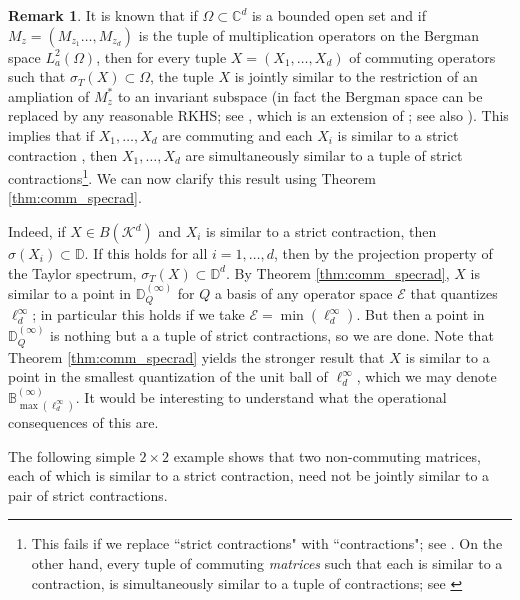 \documentclass[12pt]{amsart}
\numberwithin{equation}{section}
\theoremstyle{definition}
\newtheorem{remark}[theorem]{Remark}
\newcommand{\cE}{\mathcal{E}}
\newcommand{\cK}{\mathcal{K}}
\newcommand{\bB}{\mathbb{B}}
\newcommand{\bC}{\mathbb{C}}
\newcommand{\bD}{\mathbb{D}}
\begin{document}
\begin{remark}
It is known that if $\Omega \subset \bC^d$ is a bounded open set and if $M_z = (M_{z_1} \ldots, M_{z_d})$ is the tuple of multiplication operators on the Bergman space $L^2_a(\Omega)$, then for every tuple $X = (X_1, \ldots, X_d)$ of commuting operators such that $\sigma_T(X) \subset \Omega$, the tuple $X$ is jointly similar to the restriction of an ampliation of $M_z^*$ to an invariant subspace (in fact the Bergman space can be replaced by any reasonable RKHS; see \cite[Application 5.27]{Curto-applications}, which is an extension of \cite[Theorem 2]{ball1977rota}; see also \cite[Theorem 3.1]{fong1978renorming} ). 
This implies that if $X_1, \ldots, X_d$ are commuting and each $X_i$ is similar to a strict contraction , then $X_1, \ldots, X_d$ are simultaneously similar to a tuple of strict contractions\footnote{This fails if we replace ``strict contractions" with ``contractions"; see \cite[Theorem 2.1]{pisier1998joint}. On the other hand, every tuple of commuting {\em matrices} such that each is similar to a contraction, is simultaneously similar to a tuple of contractions; see \cite[Theorem 1.2]{clouatre2019joint}}. 
We can now clarify this result using Theorem \ref{thm:comm_specrad}. 

Indeed, if $X \in B(\cK^d)$ and $X_i$ is similar to a strict contraction, then $\sigma(X_i) \subset \bD$. 
If this holds for all $i=1, \ldots, d$, then by the projection property of the Taylor spectrum, $\sigma_T(X) \subset \bD^d$. 
By Theorem \ref{thm:comm_specrad}, $X$ is similar to a point in $\bD_Q^{(\infty)}$ for $Q$ a basis of any operator space $\cE$ that quantizes $\ell^\infty_d$; in particular this holds if we take $\cE = \min(\ell^\infty_d)$. 
But then a point in $\bD_Q^{(\infty)}$ is nothing but a a tuple of strict contractions, so we are done. 
Note that Theorem \ref{thm:comm_specrad} yields the stronger result that $X$ is similar to a point in the smallest quantization of the unit ball of $\ell^\infty_d$, which we may denote $\bB_{\max(\ell^\infty_d)}^{(\infty)}$. It would be interesting to understand what the operational consequences of this are.     
\end{remark}


The following simple $2 \times 2$ example shows that two non-commuting matrices, each of which is similar to a strict contraction, need not be jointly similar to a pair of strict contractions. 
\end{document}
